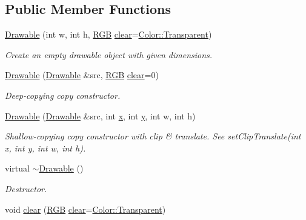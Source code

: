 \subsection*{Public Member Functions}
\begin{DoxyCompactItemize}
\item 
\hyperlink{classGUI_1_1Drawable_a0ae6adb7a236647e0a7f22d1402adb7b}{Drawable} (int w, int h, \hyperlink{namespaceGUI_aeafd135255365f3584da0e982fc79466}{R\-G\-B} \hyperlink{classGUI_1_1Drawable_a7cc6ef04bf37bed0be886b4376c8c173}{clear}=\hyperlink{namespaceGUI_1_1Color_a7ec3cc2d0178f404a31dac73d2048a10}{Color\-::\-Transparent})
\begin{DoxyCompactList}\small\item\em Create an empty drawable object with given dimensions. \end{DoxyCompactList}\item 
\hyperlink{classGUI_1_1Drawable_a093feedf8392b2a8ec9db583deb0f6c5}{Drawable} (\hyperlink{classGUI_1_1Drawable}{Drawable} \&src, \hyperlink{namespaceGUI_aeafd135255365f3584da0e982fc79466}{R\-G\-B} \hyperlink{classGUI_1_1Drawable_a7cc6ef04bf37bed0be886b4376c8c173}{clear}=0)
\begin{DoxyCompactList}\small\item\em Deep-\/copying copy constructor. \end{DoxyCompactList}\item 
\hypertarget{classGUI_1_1Drawable_af15d26cf8727db29888212c17d58c00d}{\hyperlink{classGUI_1_1Drawable_af15d26cf8727db29888212c17d58c00d}{Drawable} (\hyperlink{classGUI_1_1Drawable}{Drawable} \&src, int \hyperlink{classGUI_1_1Drawable_a098294925bd310aa41080a2441790b80}{x}, int \hyperlink{classGUI_1_1Drawable_a574c99954cc268937f2c66ebe1332316}{y}, int w, int h)}\label{classGUI_1_1Drawable_af15d26cf8727db29888212c17d58c00d}

\begin{DoxyCompactList}\small\item\em Shallow-\/copying copy constructor with clip \& translate. See set\-Clip\-Translate(int x, int y, int w, int h). \end{DoxyCompactList}\item 
\hypertarget{classGUI_1_1Drawable_a51981686e6cf38d904cdfaa40c5996e4}{virtual \hyperlink{classGUI_1_1Drawable_a51981686e6cf38d904cdfaa40c5996e4}{$\sim$\-Drawable} ()}\label{classGUI_1_1Drawable_a51981686e6cf38d904cdfaa40c5996e4}

\begin{DoxyCompactList}\small\item\em Destructor. \end{DoxyCompactList}\item 
\hypertarget{classGUI_1_1Drawable_a7cc6ef04bf37bed0be886b4376c8c173}{void \hyperlink{classGUI_1_1Drawable_a7cc6ef04bf37bed0be886b4376c8c173}{clear} (\hyperlink{namespaceGUI_aeafd135255365f3584da0e982fc79466}{R\-G\-B} \hyperlink{classGUI_1_1Drawable_a7cc6ef04bf37bed0be886b4376c8c173}{clear}=\hyperlink{namespaceGUI_1_1Color_a7ec3cc2d0178f404a31dac73d2048a10}{Color\-::\-Transparent})}\label{classGUI_1_1Drawable_a7cc6ef04bf37bed0be886b4376c8c173}


\end{DoxyCompactItemize}
